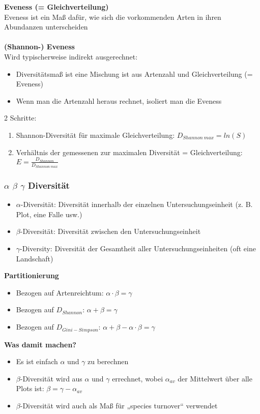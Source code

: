 \newpage
\textbf{Eveness (= Gleichverteilung)}\\
Eveness ist ein Maß dafür, wie sich die vorkommenden Arten in ihren Abundanzen unterscheiden
\\\\
\textbf{(Shannon-) Eveness}\\
Wird typischerweise indirekt ausgerechnet:
\begin{itemize}
	\item Diversitätsmaß ist eine Mischung ist aus Artenzahl und Gleichverteilung (= Eveness)
	\item Wenn man die Artenzahl heraus rechnet, isoliert man die Eveness
\end{itemize}

2 Schritte:
\begin{enumerate}
	\item Shannon-Diversität für maximale Gleichverteilung: $D_{Shannon\ max}=ln(S)$
	\item Verhältnis der gemessenen zur maximalen Diversität = Gleichverteilung: $E=\frac{D_{Shannon}}{D_{Shannon\ max}}$
\end{enumerate}

\subsubsection{$\alpha$ $\beta$ $\gamma$ Diversität}
\begin{itemize}
	\item $\alpha$-Diversität: Diversität innerhalb der einzelnen Untersuchungseinheit (z. B. Plot, eine Falle usw.)
	\item $\beta$-Diversität: Diversität zwischen den Untersuchungseinheit
	\item $\gamma$-Diversity: Diversität der Gesamtheit aller Untersuchungseinheiten (oft eine Landschaft)
\end{itemize}

\textbf{Partitionierung}
\begin{itemize}
	\item Bezogen auf Artenreichtum: $\alpha \cdot \beta = \gamma$
	\item Bezogen auf $D_{Shannon}$: $\alpha + \beta = \gamma$
	\item Bezogen auf $D_{Gini-Simpson}$: $\alpha + \beta - \alpha \cdot \beta = \gamma$
\end{itemize}

\textbf{Was damit machen?}
\begin{itemize}
	\item Es ist einfach $\alpha$ und $\gamma$ zu berechnen
	\item $\beta$-Diversität wird aus $\alpha$ und $\gamma$ errechnet, wobei $\alpha_{av}$ der Mittelwert über alle Plots ist: $\beta=\gamma-\alpha_{av}$
	\item $\beta$-Diversität wird auch als Maß für „species turnover“ verwendet
\end{itemize}

